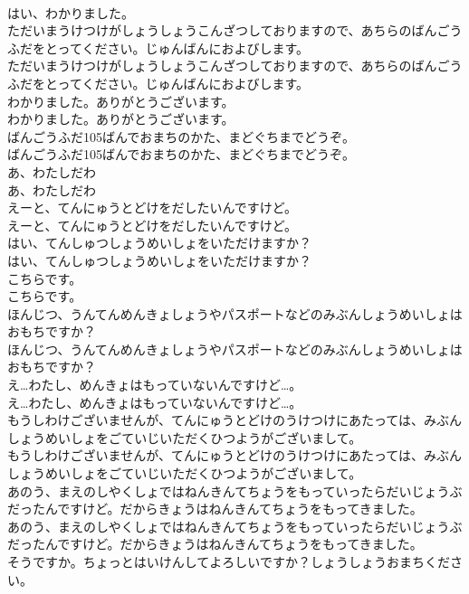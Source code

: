 \documentclass[8pt]{extreport}
\begin{document}
\begin{CJK}{UTF8}{min}
\\	はい、わかりました。
\\	ただいまうけつけがしょうしょうこんざつしておりますので、あちらのばんごうふだをとってください。じゅんばんにおよびします。
\\	ただいまうけつけがしょうしょうこんざつしておりますので、あちらのばんごうふだをとってください。じゅんばんにおよびします。
\\	わかりました。ありがとうございます。
\\	わかりました。ありがとうございます。
\\	ばんごうふだ105ばんでおまちのかた、まどぐちまでどうぞ。
\\	ばんごうふだ105ばんでおまちのかた、まどぐちまでどうぞ。
\\	あ、わたしだわ
\\	あ、わたしだわ
\\	えーと、てんにゅうとどけをだしたいんですけど。
\\	えーと、てんにゅうとどけをだしたいんですけど。
\\	はい、てんしゅつしょうめいしょをいただけますか？
\\	はい、てんしゅつしょうめいしょをいただけますか？
\\	こちらです。
\\	こちらです。
\\	ほんじつ、うんてんめんきょしょうやパスポートなどのみぶんしょうめいしょはおもちですか？
\\	ほんじつ、うんてんめんきょしょうやパスポートなどのみぶんしょうめいしょはおもちですか？
\\	え…わたし、めんきょはもっていないんですけど…。
\\	え…わたし、めんきょはもっていないんですけど…。
\\	もうしわけございませんが、てんにゅうとどけのうけつけにあたっては、みぶんしょうめいしょをごていじいただくひつようがございまして。
\\	もうしわけございませんが、てんにゅうとどけのうけつけにあたっては、みぶんしょうめいしょをごていじいただくひつようがございまして。
\\	あのう、まえのしやくしょではねんきんてちょうをもっていったらだいじょうぶだったんですけど。だからきょうはねんきんてちょうをもってきました。
\\	あのう、まえのしやくしょではねんきんてちょうをもっていったらだいじょうぶだったんですけど。だからきょうはねんきんてちょうをもってきました。
\\	そうですか。ちょっとはいけんしてよろしいですか？しょうしょうおまちください。

\end{CJK}
\end{document}

